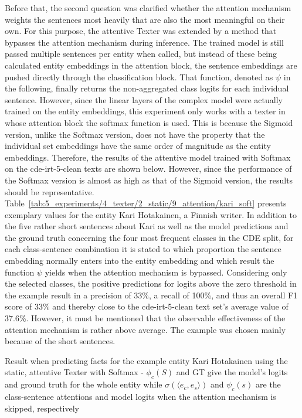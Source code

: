 Before that, the second question was clarified whether the attention mechanism weights the sentences most heavily that are also the most meaningful on their own. For this purpose, the attentive Texter was extended by a method that bypasses the attention mechanism during inference. The trained model is still passed multiple sentences per entity when called, but instead of these being calculated entity embeddings in the attention block, the sentence embeddings are pushed directly through the classification block. That function, denoted as $\psi$ in the following, finally returns the non-aggregated class logits for each individual sentence. However, since the linear layers of the complex model were actually trained on the entity embeddings, this experiment only works with a texter in whose attention block the softmax function is used. This is because the Sigmoid version, unlike the Softmax version, does not have the property that the individual set embeddings have the same order of magnitude as the entity embeddings. Therefore, the results of the attentive model trained with Softmax on the cde-irt-5-clean texts are shown below. However, since the performance of the Softmax version is almost as high as that of the Sigmoid version, the results should be representative. Table~\ref{tab:5_experiments/4_texter/2_static/9_attention/kari_soft} presents exemplary values for the entity Kari Hotakainen, a Finnish writer. In addition to the five rather short sentences about Kari as well as the model predictions and the ground truth concerning the four most frequent classes in the CDE split, for each class-sentence combination it is stated to which proportion the sentence embedding normally enters into the entity embedding and which result the function $\psi$ yields when the attention mechanism is bypassed. Considering only the selected classes, the positive predictions for logits above the zero threshold in the example result in a precision of 33\%, a recall of 100\%, and thus an overall F1 score of 33\% and thereby close to the cde-irt-5-clean text set's average value of 37.6\%. However, it must be mentioned that the observable effectiveness of the attention mechanism is rather above average. The example was chosen mainly because of the short sentences.

\begin{table}[h]
    \centering
    
    \caption{Result when predicting facts for the example entity Kari Hotakainen using the static, attentive Texter with Softmax - $\phi_c(S)$ and GT give the model's logits and ground truth for the whole entity while $\sigma(\langle e_c, e_s \rangle)$ and $\psi_c(s)$ are the class-sentence attentions and model logits when the attention mechanism is skipped, respectively}
    \label{tab:5_experiments/4_texter/2_static/9_attention/kari_soft}
\end{table}

